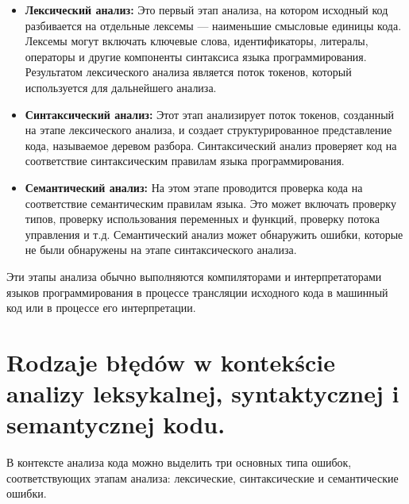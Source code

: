 \begin{itemize}
\item \textbf{Лексический анализ:} Это первый этап анализа, на котором исходный код разбивается на отдельные лексемы — наименьшие смысловые единицы кода. Лексемы могут включать ключевые слова, идентификаторы, литералы, операторы и другие компоненты синтаксиса языка программирования. Результатом лексического анализа является поток токенов, который используется для дальнейшего анализа.

\item \textbf{Синтаксический анализ:} Этот этап анализирует поток токенов, созданный на этапе лексического анализа, и создает структурированное представление кода, называемое деревом разбора. Синтаксический анализ проверяет код на соответствие синтаксическим правилам языка программирования.

\item \textbf{Семантический анализ:} На этом этапе проводится проверка кода на соответствие семантическим правилам языка. Это может включать проверку типов, проверку использования переменных и функций, проверку потока управления и т.д. Семантический анализ может обнаружить ошибки, которые не были обнаружены на этапе синтаксического анализа.
\end{itemize}

Эти этапы анализа обычно выполняются компиляторами и интерпретаторами языков программирования в процессе трансляции исходного кода в машинный код или в процессе его интерпретации.

\section{Rodzaje błędów w kontekście analizy leksykalnej, syntaktycznej i semantycznej kodu.}

В контексте анализа кода можно выделить три основных типа ошибок, соответствующих этапам анализа: лексические, синтаксические и семантические ошибки.

